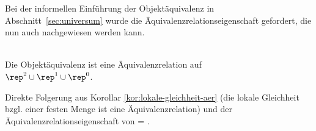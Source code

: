 %
    Bei der informellen Einführung der Objektäquivalenz in Abschnitt~\ref{sec:universum} wurde die Äquivalenzrelationseigenschaft gefordert, die nun auch nachgewiesen werden kann.
%    
    \begin{satz}\ \\
        Die Objektäquivalenz ist eine Äquivalenzrelation auf\\
        $\rep^2 \cup \rep^1 \cup \rep^0$.
    \end{satz}
%    
    \begin{bew}
		Direkte Folgerung aus Korollar \ref{kor:lokale-gleichheit-aer} (die lokale Gleichheit bzgl. einer festen Menge ist eine Äquivalenzrelation) und der Äquivalenzrelationseigenschaft von \glqq = \grqq .
    \end{bew}
 
    
    
    
    

